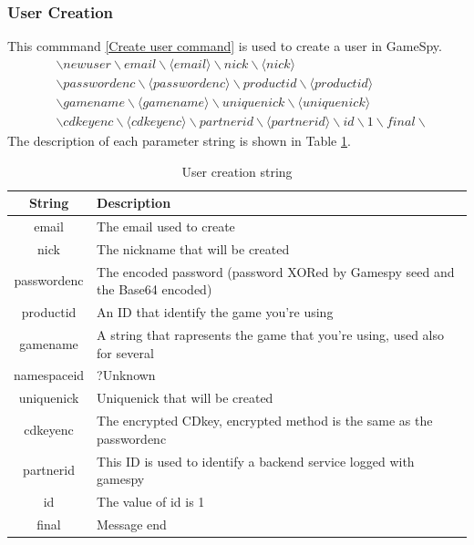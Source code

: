 \documentclass[oneside,titlepage,a4paper]{report} %
\begin{document}
\subsubsection{User Creation}
This commmand \ref{Create user command} is used to create a user in GameSpy.
\begin{equation}\label{Create user command}
\begin{split}
&\backslash newuser \backslash email \backslash \langle email \rangle \backslash nick \backslash \langle nick \rangle \\& \backslash passwordenc \backslash \langle passwordenc \rangle 
\backslash productid \backslash \langle productid \rangle \\& \backslash gamename \backslash \langle gamename \rangle \backslash uniquenick \backslash \langle uniquenick \rangle \\& \backslash cdkeyenc \backslash \langle cdkeyenc \rangle \backslash partnerid \backslash \langle partnerid \rangle \backslash id \backslash 1 \backslash final \backslash
\end{split}	
\end{equation}
The description of each parameter string is shown in Table \ref{User creation string}.
\begin{table}[H]
	\centering
	\begin{tabular}{|c|>{\centering\arraybackslash}p{9cm}|}
		\hline
		  String    & Description                                                                  \\ \hline
		   email    & The email used to create                                                     \\ \hline
		   nick     & The nickname that will be created                                            \\ \hline
		passwordenc & The encoded password (password XORed by Gamespy seed and the Base64 encoded) \\ \hline
		 productid  & An ID that identify the game you're using                                    \\ \hline
		 gamename   & A string that rapresents the game that you're using, used also for several   \\ \hline
		namespaceid & ?Unknown                                                                     \\ \hline
		uniquenick  & Uniquenick that will be created                                              \\ \hline
		 cdkeyenc   & The encrypted CDkey, encrypted method is the same as the passwordenc         \\ \hline
		 partnerid  & This ID is used to identify a backend service logged with gamespy            \\ \hline
		    id      & The value of id is 1                                                         \\ \hline
		   final    & Message end                                                                  \\ \hline
	\end{tabular}
\caption{User creation string}
\label{User creation string}
\end{table}
\end{document}
